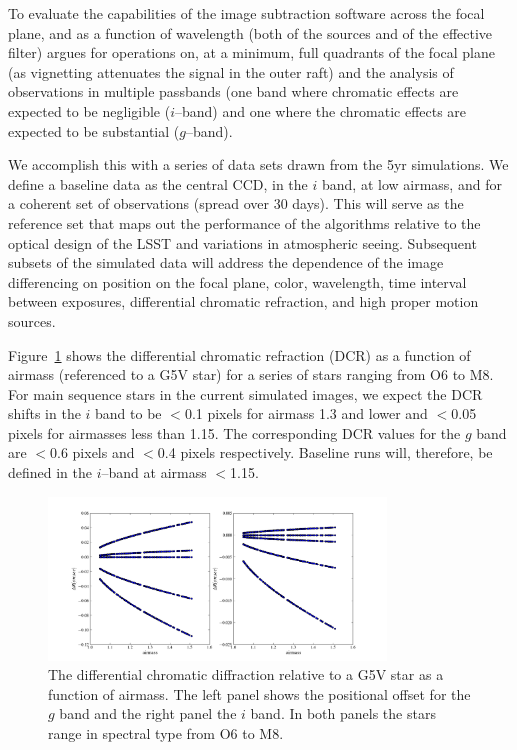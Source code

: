 \documentclass[12pt]{article}
\begin{document}
To evaluate the capabilities of the image subtraction software across
the focal plane, and as a function of wavelength (both of the sources
and of the effective filter) argues for operations on, at a minimum,
full quadrants of the focal plane (as vignetting attenuates the signal
in the outer raft) and the analysis of observations in multiple
passbands (one band where chromatic effects are expected to be
negligible ($i$--band) and one where the chromatic effects are
expected to be substantial ($g$--band).

We accomplish this with a series of data sets drawn from the 5yr
simulations. We define a baseline data as the central CCD, in the $i$
band, at low airmass, and for a coherent set of observations (spread
over 30 days).  This will serve as the reference set that maps out the
performance of the algorithms relative to the optical design of the
LSST and variations in atmospheric seeing. Subsequent subsets of the
simulated data will address the dependence of the image differencing
on position on the focal plane, color, wavelength, time interval
between exposures, differential chromatic refraction, and high proper
motion sources. 

Figure~\ref{DCR} shows the differential chromatic refraction (DCR) as
a function of airmass (referenced to a G5V star) for a series of stars
ranging from O6 to M8. For main sequence stars in the current
simulated images, we expect the DCR shifts in the $i$ band to be
$<$0.1 pixels for airmass 1.3 and lower and $<$0.05 pixels for
airmasses less than 1.15. The corresponding DCR values for the $g$
band are $<$0.6 pixels and $<$0.4 pixels respectively. Baseline runs
will, therefore, be defined in the $i$--band at airmass $<$1.15.



\begin{figure}
\centerline{\includegraphics[width=0.8\textwidth]{Figures/DCR_R_stars.png}}
\caption{The differential chromatic diffraction relative to a G5V star
  as a function of airmass. The left panel shows the positional offset
  for the $g$ band and the right panel the $i$ band. In both panels
  the stars range in spectral type from O6 to M8.}
\label{DCR}
\end{figure}
\end{document}
